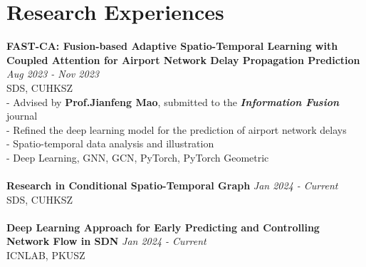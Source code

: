 \documentclass[a4paper,10pt]{article}
\begin{document}
\section*{Research Experiences}
\textbf{FAST-CA: Fusion-based Adaptive Spatio-Temporal Learning with Coupled Attention for Airport Network Delay Propagation Prediction} \hfill \textit{Aug 2023 - Nov 2023}\\
SDS, CUHKSZ\\
- Advised by \textbf{Prof.\@ Jianfeng Mao}, submitted to the \textbf{\textit{Information Fusion}} journal\\
- Refined the deep learning model for the prediction of airport network delays\\
- Spatio-temporal data analysis and illustration\\
- Deep Learning, GNN, GCN, PyTorch, PyTorch Geometric\\
\\
\textbf{Research in Conditional Spatio-Temporal Graph} \hfill \textit{Jan 2024 - Current}\\
SDS, CUHKSZ\\
\\
\textbf{Deep Learning Approach for Early Predicting and Controlling Network Flow in SDN} \hfill \textit{Jan 2024 - Current}\\
ICNLAB, PKUSZ\\
\end{document}
